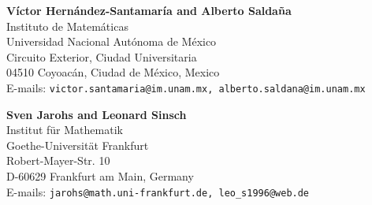 \documentclass[11 pt]{article}
\numberwithin{equation}{section}
\begin{document}
%
%
%
%

 
 


\bigskip
\begin{flushleft}
\textbf{Víctor Hernández-Santamaría and Alberto Saldaña}\\
Instituto de Matemáticas\\
Universidad Nacional Autónoma de México\\
Circuito Exterior, Ciudad Universitaria\\
04510 Coyoacán, Ciudad de México, Mexico\\
E-mails: \texttt{victor.santamaria@im.unam.mx, alberto.saldana@im.unam.mx} 
\vspace{.3cm}
\end{flushleft}
\begin{flushleft}
\textbf{Sven Jarohs and Leonard Sinsch}\\
Institut f\"ur Mathematik\\
Goethe-Universit\"at Frankfurt\\
Robert-Mayer-Str. 10\\
D-60629 Frankfurt am Main, Germany  \\
E-mails: \texttt{jarohs@math.uni-frankfurt.de, leo\_s1996@web.de} 
\vspace{.3cm}
\end{flushleft}
\end{document}
